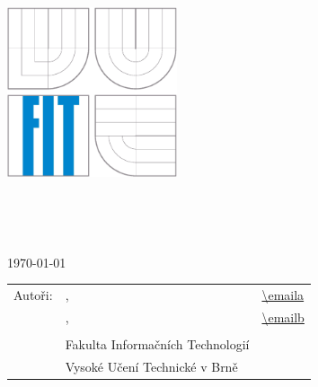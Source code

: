 \begin{titlepage}
	\begin{center}
		\includegraphics[height=5cm]{images/logo.eps}
	\end{center}
	\vfill
	\begin{center}
		\begin{Large}
			\docname\\
		\end{Large}
		\bigskip
		\begin{Huge}
			\projname\\
		\end{Huge}
	\end{center}
	\vfill
	\begin{center}
		\begin{large}
			\today
		\end{large}
	\end{center}
	\vfill
	\begin{flushleft}
		\begin{large}
			\begin{tabular}{lll}
				Autoři: & \authora, & \url{\emaila} \\
				        & \authorb, & \url{\emailb} \\
				& & \\
				& Fakulta Informačních Technologií \\
				& Vysoké Učení Technické v Brně \\
			\end{tabular}
		\end{large}
	\end{flushleft}
\end{titlepage}